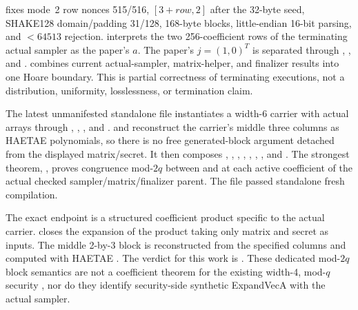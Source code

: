 \begin{verified}
 fixes mode~2 row nonces 515/516,
\([3+row,2]\) after the 32-byte seed, SHAKE128 domain/padding 31/128,
168-byte blocks, little-endian 16-bit parsing, and \(<64513\) rejection.
 interprets the two
256-coefficient rows of the terminating actual sampler as the paper's \(a\).
The paper's \(j=(1,0)^T\) is separated through
,
, and
.
 combines
current actual-sampler, matrix-helper, and finalizer results into one Hoare
boundary. This is partial correctness of terminating executions, not a
distribution, uniformity, losslessness, or termination claim.
\end{verified}

\begin{verified}
The latest unmanifested standalone file
 instantiates a width-6 carrier with
actual arrays through
,
,
, and
.
 and
 reconstruct the carrier's middle
three columns as HAETAE polynomials, so there is no free generated-block
argument detached from the displayed matrix/secret.
It then composes
,
,
,
,
,
,
, and
.
The strongest theorem,
,
proves congruence mod-\(2q\) between
 and
 at each active coefficient of the actual
checked sampler/matrix/finalizer parent.
The file passed standalone  fresh compilation.

The exact endpoint is a structured coefficient product specific to the actual
carrier.  closes the expansion
of the product taking only matrix and secret as inputs.
The middle 2-by-3 block is reconstructed from the specified columns and
computed with HAETAE .
The verdict for this work is \FaithfulAugmentedVerdict.
These dedicated mod-\(2q\) block semantics are not a coefficient theorem for
the existing width-4, mod-\(q\) security , nor do
they identify security-side synthetic ExpandVecA with the actual sampler.
\cite{post-freeze-kg-faithful-augmented-report}
\end{verified}

